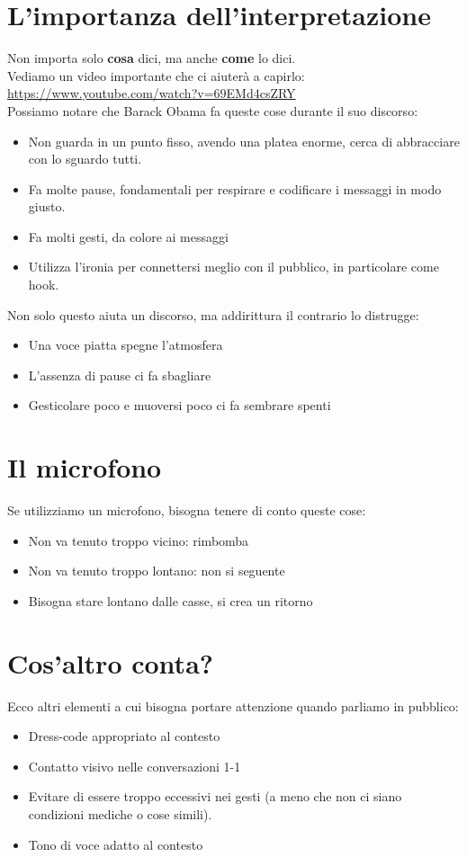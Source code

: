 \documentclass[12pt,a4paper]{article}
\let\oldsection\section
\renewcommand{\section}{\clearpage\oldsection}
\begin{document}
\section{L'importanza dell'interpretazione}
Non importa solo \textbf{cosa} dici, ma anche \textbf{come} lo dici.\\
Vediamo un video importante che ci aiuterà a capirlo: \href{https://www.youtube.com/watch?v=69EMd4csZRY}{https://www.youtube.com/watch?v=69EMd4csZRY}\\
Possiamo notare che Barack Obama fa queste cose durante il suo discorso:
\begin{itemize}
    \item Non guarda in un punto fisso, avendo una platea enorme, cerca di abbracciare con lo sguardo tutti.
    \item Fa molte pause, fondamentali per respirare e codificare i messaggi in modo giusto.
    \item Fa molti gesti, da colore ai messaggi
    \item Utilizza l'ironia per connettersi meglio con il pubblico, in particolare come hook.
\end{itemize}
Non solo questo aiuta un discorso, ma addirittura il contrario lo distrugge:
\begin{itemize}
    \item Una voce piatta spegne l'atmosfera
    \item L'assenza di pause ci fa sbagliare
    \item Gesticolare poco e muoversi poco ci fa sembrare spenti
\end{itemize}

\section{Il microfono}
Se utilizziamo un microfono, bisogna tenere di conto queste cose:
\begin{itemize}
    \item Non va tenuto troppo vicino: rimbomba
    \item Non va tenuto troppo lontano: non si seguente
    \item Bisogna stare lontano dalle casse, si crea un ritorno
\end{itemize}

\section{Cos'altro conta?}
Ecco altri elementi a cui bisogna portare attenzione quando parliamo in pubblico:
\begin{itemize}
    \item Dress-code appropriato al contesto
    \item Contatto visivo nelle conversazioni 1-1
    \item Evitare di essere troppo eccessivi nei gesti (a meno che non ci siano condizioni mediche o cose simili).
    \item Tono di voce adatto al contesto
\end{itemize}
\end{document}
